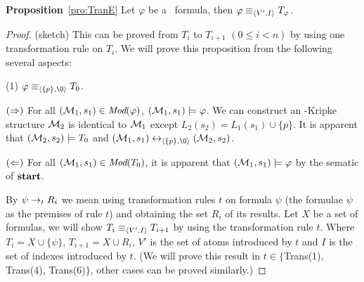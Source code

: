 \documentclass[letterpaper]{article}
\begin{document}
\noindent\textbf{Proposition}~\ref{pro:TranE}
 Let $\varphi$ be a \CTL\ formula, then $\varphi \equiv_{{\langle{V', I}\rangle}} T_{\varphi}$.
\begin{proof} (sketch)
This can be proved from $T_i$ to $T_{i+1}$ $(0\leq i < n)$ by using one transformation rule on $T_i$.
We will prove this proposition from the following several aspects:

(1) $\varphi \equiv_{\tuple{\{p\}, {\O}}} T_0$.

$(\Rightarrow)$ For all $({\cal M}_1,s_1) \in \textit{Mod}(\varphi)$, \ie $({\cal M}_1,s_1) \models \varphi$. We can construct an \Ind-Kripke structure ${\cal M}_2$ is identical to ${\cal M}_1$ except $L_2(s_2) = L_1(s_1) \cup \{p\}$. It is apparent that $({\cal M}_2,s_2) \models T_0$ and $(\Hm_1, s_1) \lrto_{\tuple{\{p\}, {\O}}} (\Hm_2, s_2)$.

$(\Leftarrow)$ For all $({\cal M}_1,s_1) \in \textit{Mod}(T_0)$, it is apparent that $({\cal M}_1,s_1) \models \varphi$ by the sematic of $\textbf{start}$.

By $\psi \rightarrow_t R_i$ we mean using transformation rules $t$ on formula $\psi$ (the formulae $\psi$ as the
premises of rule $t$) and obtaining the set  $R_i$ of its results. Let $X$ be a set of formulas,
we will show $T_i \equiv_{{\langle{V',I}\rangle}} T_{i+1}$ by using the transformation rule $t$. Where $T_i= X \cup \{\psi\}$, $T_{i+1}=X \cup R_i$, $V'$ is the set of atoms introduced by $t$ and $I$ is the set of indexes introduced by $t$. (We will prove this result in $t\in \{$Trans(1), Trans(4), Trans(6)$\}$, other cases can be proved similarly.)


\end{proof}
\end{document}
